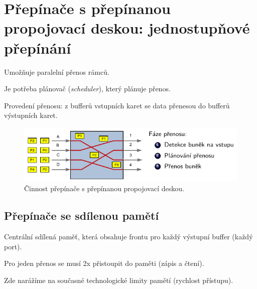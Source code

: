 
\section{Přepínače s přepínanou propojovací deskou: jednostupňové přepínání}

\begin{compactitem}
    \item Umožňuje paralelní přenos rámců.
    \item Je potřeba plánovač (\textit{scheduler}), který plánuje přenos.
    \item Provedení přenosu: z bufferů vstupních karet se data přenesou do bufferů výstupních karet.
\end{compactitem}

\begin{figure}[H]
    \centering
    \includegraphics[width=1\linewidth]{prepinana_propojovaci_deska.pdf}
    \caption{Činnost přepínače s přepínanou propojovací deskou.}
\end{figure}

\subsection{Přepínače se sdílenou pamětí}

\begin{compactitem}
    \item Centrální sdílená paměť, která obsahuje frontu pro každý výstupní buffer (každý port).
    \item Pro jeden přenos se musí 2x přistoupit do paměti (zápis a čtení).
    \item Zde narážíme na současné technologické limity pamětí (rychlost přístupu).
\end{compactitem}

